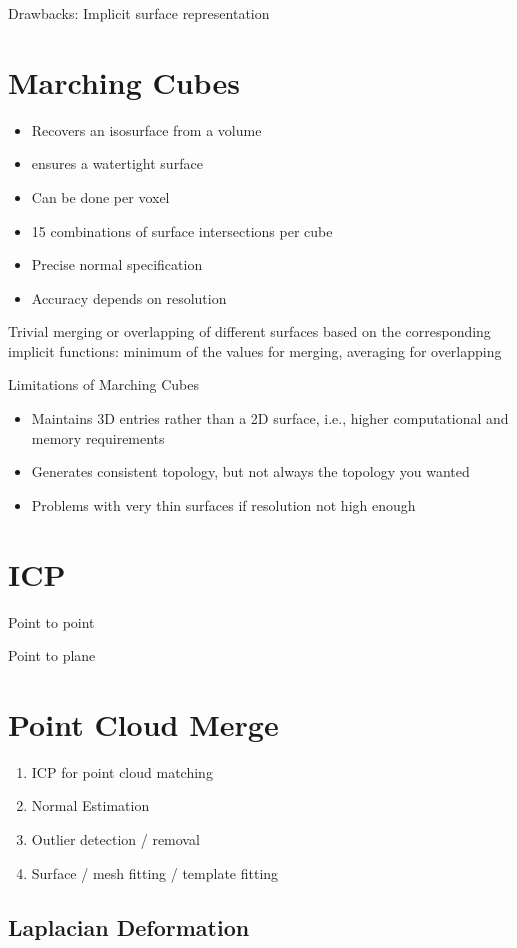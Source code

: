 Drawbacks: Implicit surface representation

\section{Marching Cubes}
\begin{itemize}
\item Recovers an isosurface from a volume
\item ensures a watertight surface
\item Can be done per voxel
\item 15 combinations of surface intersections per cube
\item Precise normal specification
\item Accuracy depends on resolution
\end{itemize}

Trivial merging or overlapping of different surfaces based on the corresponding implicit functions:
minimum of the values for merging, averaging for overlapping

Limitations of Marching Cubes
\begin{itemize}
\item  Maintains 3D entries rather than a 2D surface, i.e., higher computational and memory requirements
\item  Generates consistent topology, but not always the topology you wanted
\item  Problems with very thin surfaces if resolution not high enough
\end{itemize}

\section{ICP}

Point to point

Point to plane

\section{Point Cloud Merge}

\begin{enumerate}
\item ICP for point cloud matching
\item Normal Estimation
\item Outlier detection / removal 
\item Surface / mesh fitting / template fitting
\end{enumerate}

\subsection{Laplacian Deformation}